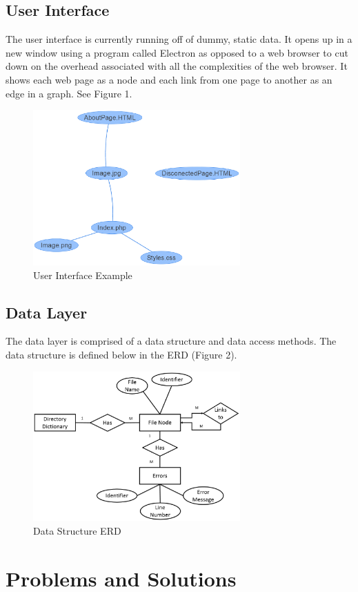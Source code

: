 \documentclass[letterpaper,10pt,titlepage,draftclsnofoot,onecolumn,onesided] {IEEEtran}
\begin{document}
\subsection{User Interface}
The user interface is currently running off of dummy, static data. 
It opens up in a new window using a program called Electron as opposed to a web browser to cut down on the overhead associated with all the complexities of the web browser.
It shows each web page as a node and each link from one page to another as an edge in a graph. See Figure 1.
\begin{figure}
\includegraphics[width=300px]{UIMockupEPS}
\caption{User Interface Example}
\end{figure}

\subsection{Data Layer}
The data layer is comprised of a data structure and data access methods.
The data structure is defined below in the ERD (Figure 2).
\begin{figure}
\includegraphics[width=300px]{InformationERDEPS}
\caption{Data Structure ERD}
\end{figure}

\section{Problems and Solutions}
\end{document}

